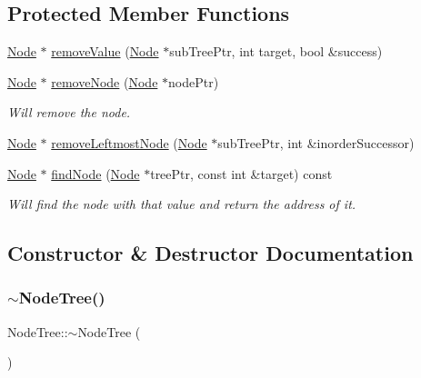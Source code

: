 \subsection*{Protected Member Functions}
\begin{DoxyCompactItemize}
\item 
\mbox{\hyperlink{class_node}{Node}} $\ast$ \mbox{\hyperlink{class_node_tree_a5f976e7369dcc91276df40678b59c33c}{remove\+Value}} (\mbox{\hyperlink{class_node}{Node}} $\ast$sub\+Tree\+Ptr, int target, bool \&success)
\item 
\mbox{\hyperlink{class_node}{Node}} $\ast$ \mbox{\hyperlink{class_node_tree_a68eae12d4ddd719e761e9e96211c8568}{remove\+Node}} (\mbox{\hyperlink{class_node}{Node}} $\ast$node\+Ptr)
\begin{DoxyCompactList}\small\item\em Will remove the node. \end{DoxyCompactList}\item 
\mbox{\hyperlink{class_node}{Node}} $\ast$ \mbox{\hyperlink{class_node_tree_a56b97fb5f2ea3ed32ec901e1a5589f89}{remove\+Leftmost\+Node}} (\mbox{\hyperlink{class_node}{Node}} $\ast$sub\+Tree\+Ptr, int \&inorder\+Successor)
\item 
\mbox{\hyperlink{class_node}{Node}} $\ast$ \mbox{\hyperlink{class_node_tree_a3f5897a41812b5694c57140eb5ade884}{find\+Node}} (\mbox{\hyperlink{class_node}{Node}} $\ast$tree\+Ptr, const int \&target) const
\begin{DoxyCompactList}\small\item\em Will find the node with that value and return the address of it. \end{DoxyCompactList}\end{DoxyCompactItemize}


\subsection{Constructor \& Destructor Documentation}
\mbox{\label{class_node_tree_a3ad091290982424bcc0750da7133e411}} 
\subsubsection{\texorpdfstring{$\sim$\+Node\+Tree()}{~NodeTree()}}
{\footnotesize\ttfamily Node\+Tree\+::$\sim$\+Node\+Tree (\begin{DoxyParamCaption}{ }\end{DoxyParamCaption})\hspace{0.3cm}{\ttfamily [virtual]}}

